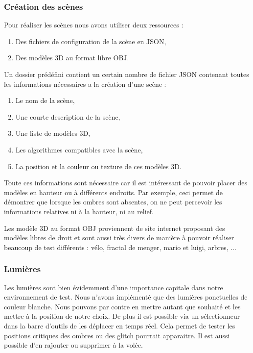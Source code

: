 \documentclass[a4paper,10pt]{report}
\begin{document}
\subsubsection{Création des scènes}

Pour réaliser les scènes nous avons utiliser deux ressources :

\begin{enumerate}
  \item Des fichiers de configuration de la scène en JSON,
  \item Des modèles 3D au format libre OBJ.
\end{enumerate}

Un dossier prédéfini contient un certain nombre de fichier JSON contenant toutes les informations nécessaires a la création d'une scène :

\begin{enumerate}
  \item Le nom de la scène,
  \item Une courte description de la scène,
  \item Une liste de modèles 3D,
  \item Les algorithmes compatibles avec la scène,
  \item La position et la couleur ou texture de ces modèles 3D.
\end{enumerate}

Toute ces informations sont nécessaire car il est intéressant de pouvoir placer des modèles en hauteur ou à différents endroits. Par exemple, ceci permet de démontrer que lorsque les ombres sont absentes, on ne peut percevoir les informations relatives ni à la hauteur, ni au relief.

Les modèle 3D au format OBJ proviennent de site internet proposant des modèles libres de droit et sont aussi très divers de manière à pouvoir réaliser beaucoup de test différents : vélo, fractal de menger, mario et luigi, arbres, ...

\subsubsection{Lumières}

Les lumières sont bien évidemment d'une importance capitale dans notre environnement de test. Nous n'avons implémenté que des lumières ponctuelles de couleur blanche. Nous pouvons par contre en mettre autant que souhaité et les mettre à la position de notre choix. De plus il est possible via un sélectionneur dans la barre d'outils de les déplacer en temps réel. Cela permet de tester les positions critiques des ombres ou des glitch pourrait apparaitre.
Il est aussi possible d'en rajouter ou supprimer à la volée.
\end{document}
